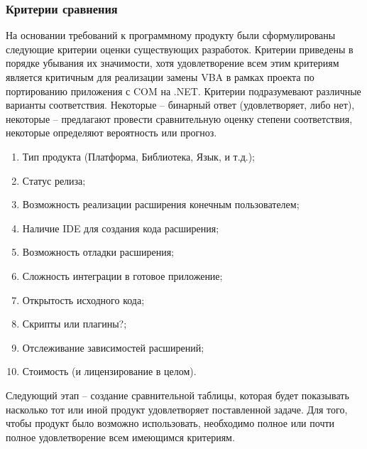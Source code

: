 
\subsubsection{Критерии сравнения}
На основании требований к программному продукту были сформулированы следующие критерии оценки существующих разработок. Критерии приведены в порядке убывания их значимости, хотя удовлетворение всем этим критериям является критичным для реализации замены VBA в рамках проекта по портированию приложения с COM на .NET. Критерии подразумевают различные варианты соответствия. Некоторые – бинарный ответ (удовлетворяет, либо нет), некоторые – предлагают провести сравнительную оценку степени соответствия, некоторые определяют вероятность или прогноз.

\begin{enumerate}
\item Тип продукта (Платформа, Библиотека, Язык, и т.д.);
\item Статус релиза;
\item Возможность реализации расширения конечным пользователем;
\item Наличие IDE для создания кода расширения;
\item Возможность отладки расширения;
\item Сложность интеграции в готовое приложение;
\item Открытость исходного кода;
\item Скрипты или плагины?;
\item Отслеживание зависимостей расширений;
\item Стоимость (и лицензирование в целом).
\end{enumerate}

Следующий этап – создание сравнительной таблицы, которая будет показывать насколько тот или иной продукт удовлетворяет поставленной задаче. Для того, чтобы продукт было возможно использовать, необходимо полное или почти полное удовлетворение всем имеющимся критериям.

\pagebreak
